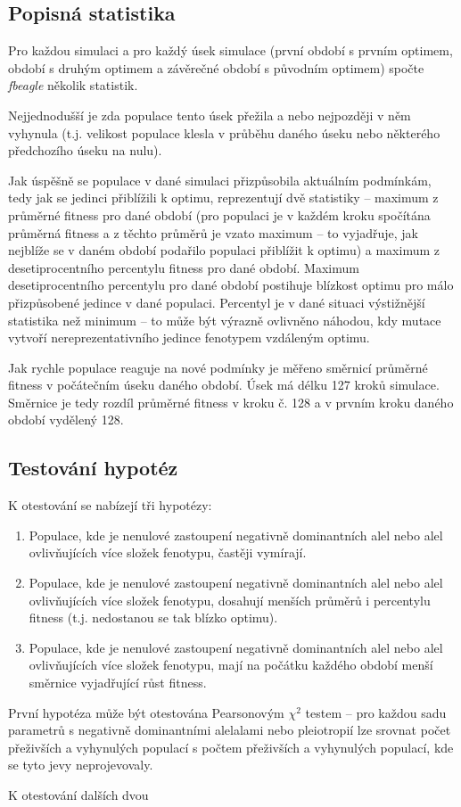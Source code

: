 \subsection{Popisná statistika}

Pro každou simulaci a pro každý úsek simulace (první období s prvním optimem,
období s druhým optimem a závěrečné období s původním optimem) spočte \textit{fbeagle} několik statistik.

Nejjednodušší je zda populace tento úsek přežila a nebo nejpozději v něm vyhynula
(t.j. velikost populace klesla v průběhu daného úseku nebo některého předchozího úseku na nulu).

Jak úspěšně se populace v dané simulaci přizpůsobila aktuálním podmínkám, tedy jak se jedinci přiblížili k optimu,
reprezentují dvě statistiky -- maximum z průměrné fitness pro dané období (pro populaci je v každém kroku
spočítána průměrná fitness a z těchto průměrů je vzato maximum -- to vyjadřuje, jak nejblíže se v daném období podařilo
populaci přiblížit k optimu) a maximum z desetiprocentního percentylu fitness pro dané období.
Maximum desetiprocentního percentylu pro dané období postihuje blízkost optimu pro
málo přizpůsobené jedince v dané populaci. Percentyl je v dané situaci výstižnější statistika než minimum -- to může
být výrazně ovlivněno náhodou, kdy mutace vytvoří nereprezentativního jedince fenotypem vzdáleným optimu.

Jak rychle populace reaguje na nové podmínky je měřeno směrnicí průměrné fitness v počátečním úseku daného období.
Úsek má délku 127 kroků simulace. Směrnice je tedy rozdíl průměrné fitness v kroku č. 128 a v prvním kroku daného
období vydělený 128.

\subsection{Testování hypotéz}

K otestování se nabízejí tři hypotézy:

\begin{enumerate}
    \item{Populace, kde je nenulové zastoupení negativně dominantních alel nebo alel ovlivňujících více složek fenotypu, častěji vymírají.}
    \item{Populace, kde je nenulové zastoupení negativně dominantních alel nebo alel ovlivňujících více složek fenotypu, dosahují menších průměrů i percentylu fitness (t.j. nedostanou se tak blízko optimu).}
    \item{Populace, kde je nenulové zastoupení negativně dominantních alel nebo alel ovlivňujících více složek fenotypu, mají na počátku každého období menší směrnice vyjadřující růst fitness.}
\end{enumerate}

První hypotéza může být otestována Pearsonovým $\chi^2$ testem -- pro každou sadu parametrů s negativně dominantními alelalami nebo pleiotropií lze srovnat počet přeživších a vyhynulých populací s počtem přeživších a vyhynulých populací, kde se tyto jevy neprojevovaly.

K otestování dalších dvou


